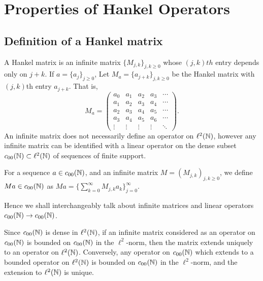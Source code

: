 
\chapter{Properties of Hankel Operators} %

\label{PropertiesOfHankelOperators} %




\section{Definition of a Hankel matrix}
A Hankel matrix is an infinite matrix $\{M_{j,k}\}_{j,k \geq 0}$
whose $(j,k)th$ entry depends only on $j+k$. If $a = \{a_j\}_{j\geq 0}$,
Let $M_a = \{a_{j+k}\}_{j,k\geq 0}$ be the Hankel matrix with $(j,k)$th
entry $a_{j+k}$. That is,
\begin{equation}
    M_a = \begin{pmatrix}
        a_0 & a_1 & a_2 & a_3 & \cdots\\
        a_1 & a_2 & a_3 & a_4 & \cdots\\
        a_2 & a_3 & a_4 & a_5 & \cdots\\
        a_3 & a_4 & a_5 & a_6 & \cdots\\
        \vdots & \vdots & \vdots & \vdots & \ddots
    \end{pmatrix}.
\end{equation}
An infinite matrix does not necessarily define an operator on $\ell^2(\mathbb{N})$, 
however any infinite matrix can be identified with a linear operator 
on the dense subset $c_{00}(\mathbb{N}) \subset \ell^2(\mathbb{N})$ of sequences
of finite support. 

For a sequence $a \in c_{00}(\mathbb{N})$, and an infinite matrix $M = (M_{j,k})_{j,k\geq 0}$, 
we define $Ma \in c_{00}(\mathbb{N})$ as $Ma = \{\sum_{k=0}^\infty M_{j,k}a_k\}_{j=0}^\infty$.

Hence we shall interchangeably talk about infinite matrices and linear
operators $c_{00}(\mathbb{N})\rightarrow c_{00}(\mathbb{N})$.

Since $c_{00}(\mathbb{N})$ is dense in $\ell^2(\mathbb{N})$, if an infinite matrix
considered as an operator on $c_{00}(\mathbb{N})$ is bounded on $c_{00}(\mathbb{N})$
in the $\ell^2$-norm, then the matrix extends uniquely to an operator on $\ell^2(\mathbb{N})$.
Conversely, any operator on $c_{00}(\mathbb{N})$ which extends to a bounded
operator on $\ell^2(\mathbb{N})$ is bounded on $c_{00}(\mathbb{N})$ in the $\ell^2$-norm,
and the extension to $\ell^2(\mathbb{N})$ is unique.


